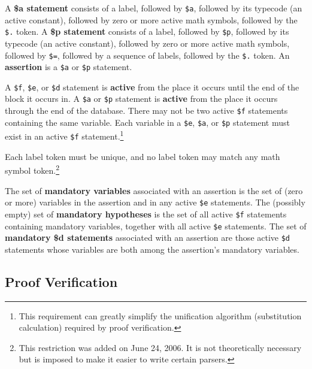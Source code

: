 A {\bf \$a statement} consists of a label,
followed by \texttt{\$a}, followed by its typecode (an active constant),
followed by
zero or more active math symbols, followed by the \texttt{\$.} token.  A {\bf
\$p statement} consists of a label,
followed by \texttt{\$p}, followed by its typecode (an active constant),
followed by
zero or more active math symbols, followed by \texttt{\$=}, followed by
a sequence of labels, followed by the \texttt{\$.} token.  An {\bf
assertion} is a \texttt{\$a} or \texttt{\$p} statement.

A \texttt{\$f}, \texttt{\$e}, or \texttt{\$d} statement is {\bf active} from the place it occurs until the end of the block it occurs in.
A \texttt{\$a} or \texttt{\$p} statement is {\bf active} from the place it occurs
through the end of the database.
There may not be two active \texttt{\$f} statements containing the same
variable.  Each variable in a \texttt{\$e}, \texttt{\$a}, or
\texttt{\$p} statement must exist in an active \texttt{\$f}
statement.\footnote{This requirement can greatly simplify the
unification algorithm (substitution calculation) required by proof
verification.}

Each label token must be unique, and
no label token may match any math symbol
token.\label{namespace}\footnote{This
restriction was added on June 24, 2006.
It is not theoretically necessary but is imposed to make it easier to
write certain parsers.}

The set of {\bf mandatory variables} associated with
an assertion is the set of (zero or more) variables in the assertion and in any
active \texttt{\$e} statements.  The (possibly empty) set of {\bf mandatory
hypotheses} is the set of all active \texttt{\$f}
statements containing mandatory variables, together with all active \texttt{\$e}
statements.
The set of {\bf mandatory {\bf \$d} statements} associated with an assertion are those active
\texttt{\$d} statements whose variables are both among the assertion's
mandatory variables.

\subsection{Proof Verification}\label{spec4}

